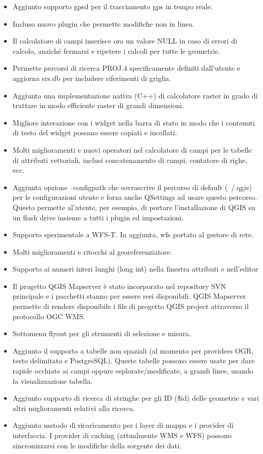 \begin{itemize}[label=--]
\item Aggiunto supporto gpsd per il tracciamento gps in tempo reale. 
\item Incluso nuovo plugin che permette modifiche non in linea.
\item Il calcolatore di campi inserisce ora un valore NULL in caso di errori di calcolo, anziché fermarsi e ripetere i calcoli per tutte le geometrie. 
\item Permette percorsi di ricerca PROJ.4 specificamente definiti dall'utente e aggiorna srs.db per includere riferimenti di griglia. 
\item Aggiunta una implementazione nativa (C++) di calcolatore raster in grado di trattare in modo efficiente raster di grandi dimensioni. 
\item Migliore interazione con i widget nella barra di stato in modo che i contenuti di testo del widget possano essere copiati e incollati.
\item Molti miglioramenti e nuovi operatori nel calcolatore di campi per le tabelle di attributi vettoriali, inclusi concatenamento di campi, contatore di righe, ecc.
\item Aggiunta opzione --configpath che sovrascrive il percorso di default (~/.qgis) per le configurazioni utente e forza anche QSettings ad usare questo percorso. Questo permette al'utente, per esempio, di portare l'installazione di QGIS su un flash drive insieme a tutti i plugin ed impostazioni. 
\item Supporto sperimentale a WFS-T. In aggiunta, wfs portato al gestore di rete. 
\item Molti miglioramenti e ritocchi al georeferenziatore. 
\item Supporto ai numeri interi lunghi (long int) nella finestra attributi e nell'editor
\item Il progetto QGIS Mapserver è stato incorporato nel repository SVN principale e i pacchetti stanno per essere resi disponibili. QGIS Mapserver permette di rendere disponibile i file di progetto QGIS project attraverso il protocollo OGC WMS.
\item Sottomenu flyout per gli strumenti di selezione e misura. 
\item Aggiunto il supporto a tabelle non spaziali (al momento per providers OGR, testo delimitato e PostgreSQL). Queste tabelle possono essere usate per dare rapide occhiate ai campi oppure esplorate/modificate, a grandi linee, usando la visualizzazione tabella.
\item Aggiunto supporto di ricerca di stringhe per gli ID (\$id) delle geometrie e vari altri miglioramenti relativi alla ricerca.
\item Aggiunto metodo di ricaricamento per i layer di mappa e i provider di interfaccia. I provider di caching (attualmente WMS e WFS) possono sincronizzarsi con le modifiche della sorgente dei dati.
\end{itemize}

